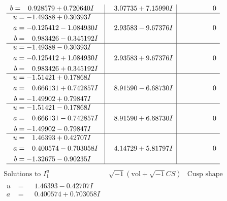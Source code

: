 \documentclass[1p]{elsarticle_modified}
\theoremstyle{definition}
\newcommand{\I}{\sqrt{-1}}
\begin{document}
$$\begin{array}{c|c|c}
\begin{aligned}
b &= \phantom{-}0.928579 + 0.720640 I\end{aligned}
 & \phantom{-}3.07735 + 7.15990 I & \phantom{-0.000000 } 0 \\ \hline\begin{aligned}
u &= -1.49388 + 0.30393 I \\
a &= -0.125412 - 1.084930 I \\
b &= \phantom{-}0.983426 - 0.345192 I\end{aligned}
 & \phantom{-}2.93583 - 9.67376 I & \phantom{-0.000000 } 0 \\ \hline\begin{aligned}
u &= -1.49388 - 0.30393 I \\
a &= -0.125412 + 1.084930 I \\
b &= \phantom{-}0.983426 + 0.345192 I\end{aligned}
 & \phantom{-}2.93583 + 9.67376 I & \phantom{-0.000000 } 0 \\ \hline\begin{aligned}
u &= -1.51421 + 0.17868 I \\
a &= \phantom{-}0.666131 + 0.742857 I \\
b &= -1.49902 + 0.79847 I\end{aligned}
 & \phantom{-}8.91590 - 6.68730 I & \phantom{-0.000000 } 0 \\ \hline\begin{aligned}
u &= -1.51421 - 0.17868 I \\
a &= \phantom{-}0.666131 - 0.742857 I \\
b &= -1.49902 - 0.79847 I\end{aligned}
 & \phantom{-}8.91590 + 6.68730 I & \phantom{-0.000000 } 0 \\ \hline\begin{aligned}
u &= \phantom{-}1.46393 + 0.42707 I \\
a &= \phantom{-}0.400574 - 0.703058 I \\
b &= -1.32675 - 0.90235 I\end{aligned}
 & \phantom{-}4.14729 + 5.81797 I & \phantom{-0.000000 } 0\\
 \hline 
 \end{array}$$\newpage$$\begin{array}{c|c|c}  
\text{Solutions to }I^u_{1}& \I (\text{vol} + \sqrt{-1}CS) & \text{Cusp shape}\\
 \hline 
\begin{aligned}
u &= \phantom{-}1.46393 - 0.42707 I \\
a &= \phantom{-}0.400574 + 0.703058 I \\

\end{aligned}
\end{array}$$
\end{document}

